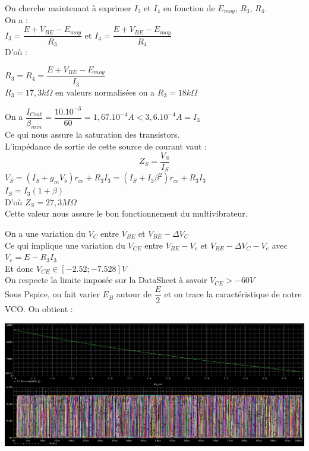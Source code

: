 \documentclass[a4paper]{report}
\begin{document}
On cherche maintenant à exprimer $I_3$ et $I_4$ en fonction de $E_{moy}$, $R_3$, $R_4$.\\
On a :\\
$I_3 = \dfrac{E + V_{BE} - E_{moy}}{R_3}$ et $I_4 = \dfrac{E + V_{BE} - E_{moy}}{R_4}$\\
D'où :\\
\begin{center}
 $R_3 = R_4 =  \dfrac{E + V_{BE} - E_{moy}}{I_3} $\\
 $R_3 = 17,3 k\Omega$ en valeurs normalisées on a $R_3 = 18 k\Omega$
\end{center}
On a $\dfrac{I_{Csat}}{\beta _{min}} = \dfrac{10.10^{-3}}{60}= 1,67.10^{-4} A < 3,6.10^{-4} A = I_3$\\
Ce qui nous assure la saturation des transistors.\\
L'impédance de sortie de cette source de courant vaut : \\
$$ Z_S = \dfrac{V_S}{I_S} $$
$V_S = (I_S + g_mV_b) r_{ce} + R_3I_3 = (I_S + I_3  \beta^2) r_{ce} + R_3I_3 $\\
$I_S = I_3(1+\beta)$\\
D'où $Z_S = 27,3 M\Omega$\\
Cette valeur nous assure le bon fonctionnement du multivibrateur.

On a une variation du $V_{C}$ entre $V_{BE}$
et $V_{BE}-\Delta V_C$\\
Ce qui implique une variation du $V_{CE}$ entre $V_{BE}-V_e$ et $V_{BE}-\Delta V_C-V_e$
avec $V_e=E-R_3I_3$\\
Et donc $V_{CE} \in [ -2.52 ; -7.528 ] V $ \\
On respecte la limite imposée sur la DataSheet à savoir $V_{CE}>-60V$ \\

Sous Pspice, on fait varier $E_B$ autour de $\dfrac{E}{2}$ et on trace la caractéristique de notre VCO. On obtient : \\
\begin{center}
\includegraphics[width=1\textwidth]{attaque_c_vco-eb.PNG}
\end{center}
\end{document}
